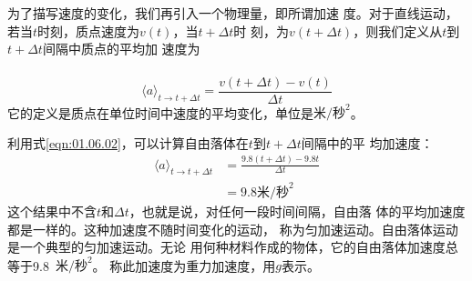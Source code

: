 \section[加速度]{}\label{sec:01.08}

为了描写速度的变化，我们再引入一个物理量，即所谓加速
度。对于直线运动，若当$t$时刻，质点速度为$v\left(t\right)$，当$t+\Delta t$时
刻，为$v\left(t+\Delta t\right)$，则我们定义从$t$到$t+\Delta t$间隔中质点的平均加
速度为\\~\vspace{-2em}
\begin{equation}\label{eqn:01.08.01}
 \langle a\rangle_{t\rightarrow t+\Delta t} = \frac{v\left(t+\Delta t\right)-v\left(t\right)}{\Delta t}
\end{equation}
它的定义是质点在单位时间中速度的平均变化，单位是$\text{米/秒}^2$。

利用式\eqref{eqn:01.06.02}，可以计算自由落体在$t$到$t+\Delta t$间隔中的平
均加速度：\vspace{-1em}
\begin{equation*}
 \begin{aligned}
 \langle a\rangle_{t\rightarrow t+\Delta t} & = \frac{9.8\left(t+\Delta t\right)-9.8t}{\Delta t} \\
 & = 9.8\text{米/秒}^2
 \end{aligned}
\end{equation*}
这个结果中不含$t$和$\Delta t$，也就是说，对任何一段时间间隔，自由落
体的平均加速度都是一样的。这种加速度不随时间变化的运动，
称为匀加速运动。自由落体运动是一个典型的匀加速运动。无论
用何种材料作成的物体，它的自由落体加速度总等于9.8~$\text{米/秒}^2$。
称此加速度为重力加速度，用$g$表示。

